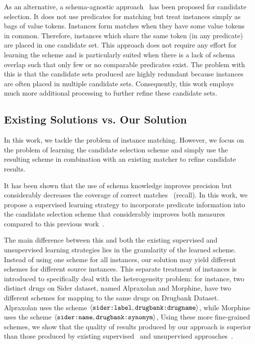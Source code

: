 As an alternative, a schema-agnostic approach~\cite{DBLP:conf/wsdm/PapadakisINF11} has been proposed for candidate selection. It does not use predicates for matching but treat instances simply as bags of value tokens. Instances form matches when they have some value tokens in common. Therefore, instances which share the same token (in any predicate) are placed in one candidate set. This approach does not require any effort for learning the scheme and is particularly suited when there is a lack of schema overlap such that only few or no comparable predicates exist. The problem with this is that the candidate sets produced are highly redundant because instances are often placed in multiple candidate sets. Consequently, this work employs much more additional processing to further refine these candidate sets. 


\subsection{Existing Solutions vs. Our Solution}
In this work, we tackle the problem of instance matching. However, we focus on the problem of learning the candidate selection scheme and simply use the resulting scheme in combination with an existing matcher to refine candidate results. 

It has been shown that the use of schema knowledge improves precision but considerably decreases the coverage of correct matches~\cite{DBLP:conf/wsdm/PapadakisINF11} (recall). In this work, we propose a supervised learning strategy to incorporate predicate information into the candidate selection scheme that considerably improves both measures compared to this previous work~\cite{}. 

The main difference between this and both the existing supervised and unsupervised learning strategies lies in the granularity of the learned scheme. Instead of using one scheme for all instances, our solution may yield different schemes for different source instances. This separate treatment of instances is introduced to specifically deal with the heterogeneity problem: for instance, two distinct drugs on Sider dataset, named Alpraxolan and Morphine, have two different schemes for mapping to the same drugs on Drugbank Dataset. Alpraxolan uses the scheme $\langle \verb+sider:label+,\verb+drugbank:drugname+ \rangle$, while Morphine uses the scheme $\langle \verb+sider:name+, \verb+drugbank:synomym+ \rangle$,  Using these more fine-grained schemes, we show that the quality of results produced by our approach is superior than those produced by existing supervised~\cite{DBLP:conf/vldb/ChaudhuriCGK07} and unsupervised approaches~\cite{DBLP:conf/semweb/SongH11}. 

